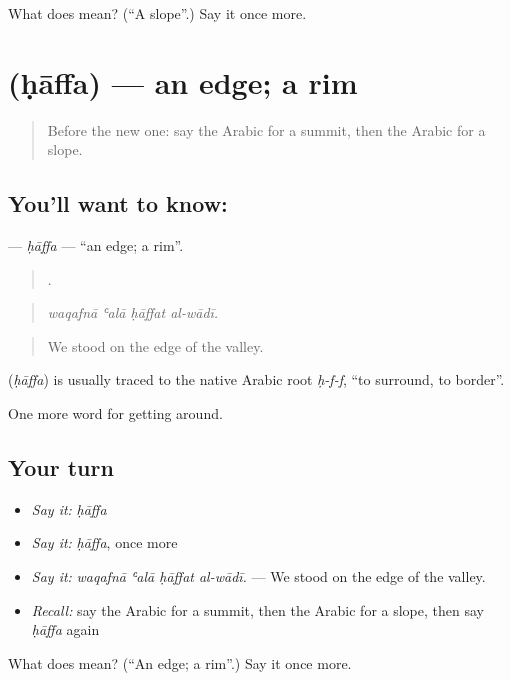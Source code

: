 \begin{tcolorbox}[breakable,colback=teal!4,colframe=teal!35!black,title={Before you move on}]
What does  mean? (\textquotedblleft{}A slope\textquotedblright{}.) Say it once more.
\end{tcolorbox}
\section[\texorpdfstring{\ar{حافة} (ḥāffa)}{حافة (ḥāffa)}]{ (ḥāffa) — an edge; a rim}

\label{lesson:AR-C472-haffa}



\begin{quote}
Before the new one: say the Arabic for a summit, then the Arabic for a slope.
\end{quote}

\subsection*{You'll want to know: }
\textbf{} — \emph{ḥāffa} — \textquotedblleft{}an edge; a rim\textquotedblright{}.

\begin{quote}
   .
\end{quote}

\begin{quote}
\emph{waqafnā ʿalā ḥāffat al-wādī.}
\end{quote}

\begin{quote}
We stood on the edge of the valley.
\end{quote}

\begin{cousinweb}
\textbf{} (\emph{ḥāffa}) is usually traced to the native Arabic root \emph{ḥ-f-f}, \textquotedblleft{}to surround, to border\textquotedblright{}.
\end{cousinweb}

\begin{grammarlens}[title={What you've built}]
One more word for getting around.
\end{grammarlens}

\subsection*{Your turn}
\begin{itemize}
\raggedright
  \item \emph{Say it:} \emph{ḥāffa}
  \item \emph{Say it:} \emph{ḥāffa}, once more
  \item \emph{Say it:} \emph{waqafnā ʿalā ḥāffat al-wādī.} — We stood on the edge of the valley.
  \item \emph{Recall:} say the Arabic for a summit, then the Arabic for a slope, then say \emph{ḥāffa} again
\end{itemize}

\begin{tcolorbox}[breakable,colback=teal!4,colframe=teal!35!black,title={Before you move on}]
What does  mean? (\textquotedblleft{}An edge; a rim\textquotedblright{}.) Say it once more.
\end{tcolorbox}
